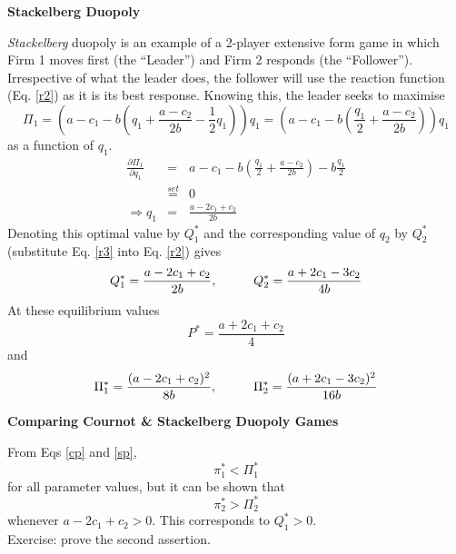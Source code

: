 \documentclass[12pt]{article}
\begin{document}
 \begin{center}
\textbf{Stackelberg Duopoly %
}
\end{center}
\textit{Stackelberg} duopoly is an example of a 2-player extensive form game in which Firm 1 moves first (the ``Leader'') and Firm 2 responds (the ``Follower''). Irrespective of what the leader does, the follower will use the reaction function (Eq. \ref{r2}) as it is its best response.
\newpage
Knowing this, the leader seeks to maximise $$ \Pi_1 = \left(a-c_1 - b\left(q_1 + \frac{a-c_2}{2b} - \frac{1}{2} q_1\right)\right) q_1 = \left(a-c_1 - b\left(\frac{q_1}{2} + \frac{a-c_2}{2b} \right)\right) q_1$$
as a function of $q_1$.
\begin{eqnarray}
 \frac{\partial \Pi_1} {\partial q_1} &=& a-c_1 - b\left(\frac{q_1}{2}+ \frac{a-c_2}{2b}\right) - b\frac{q_1}{2} \nonumber \\
 & \stackrel{set}{=} & 0 \nonumber \\
 \Rightarrow q_1 &=& \frac{a-2c_1 + c_2}{2b} \label{r3}
 \end{eqnarray}
 Denoting this optimal value by $Q_1^*$ and the corresponding value of $q_2$ by $Q_2^*$ (substitute Eq. \ref{r3} into Eq. \ref{r2}) gives
$$ Q_1^* = \frac{a-2c_1 + c_2}{2b}, \hspace{10mm} Q_2^* = \frac{a+2c_1-3c_2}{4b} $$
At these equilibrium values
$$ P^* = \frac{a+2c_1+c_2}{4} $$
 and
 \begin{equation} \Pi_1^* = \frac{(a-2c_1+ c_2)^2}{8b}, \hspace{10mm} \Pi_2^* = \frac{(a+2c_1- 3c_2)^2}{16b}\label{sp} \end{equation}

 \begin{center}
\textbf{Comparing Cournot \& Stackelberg Duopoly Games %
}
\end{center}
From Eqs \ref{cp} and \ref{sp},
$$ \pi_1^* < \Pi_1^* $$
for all parameter values, but it can be shown that
$$ \pi_2^* > \Pi_2^* $$
whenever $ a-2c_1 + c_2 > 0 $. This corresponds to $Q_1^* > 0$. \\ Exercise: prove the second assertion.
\end{document}
